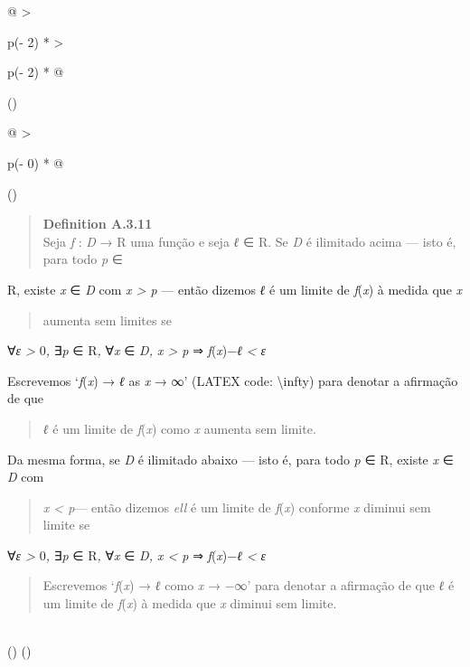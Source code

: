 \documentclass[
]{article}
\begin{document}
\begin{longtable}[]{@{}
  >{\raggedright\arraybackslash}p{(\columnwidth - 2\tabcolsep) * }
  >{\raggedright\arraybackslash}p{(\columnwidth - 2\tabcolsep) * }@{}}
\toprule()
\begin{minipage}[b]{\linewidth}\raggedright
\begin{longtable}[]{@{}
  >{\raggedright\arraybackslash}p{(\columnwidth - 0\tabcolsep) * }@{}}
\toprule()
\begin{minipage}[b]{\linewidth}\raggedright
\begin{quote}
\textbf{Definition A.3.11}\\
Seja \emph{f} : \emph{D} → R uma função e seja \emph{ℓ} ∈ R. Se \emph{D}
é ilimitado acima --- isto é, para todo \emph{p} ∈
\end{quote}

R, existe \emph{x} ∈ \emph{D} com \emph{x \textgreater{} p} --- então
dizemos \emph{ℓ} é um limite de \emph{f}(\emph{x}) à medida que \emph{x}

\begin{quote}
aumenta sem limites se
\end{quote}

∀\emph{ε \textgreater{}} 0\emph{,} ∃\emph{p} ∈ R\emph{,} ∀\emph{x} ∈
\emph{D, x \textgreater{} p} ⇒
\textbar{}\emph{f}(\emph{x})−\emph{ℓ}\textbar{} \emph{\textless{} ε}

Escrevemos `\emph{f}(\emph{x}) → \emph{ℓ} as \emph{x} → ∞' (LATEX code:
\textbackslash infty) para denotar a afirmação de que

\begin{quote}
\emph{ℓ} é um limite de \emph{f}(\emph{x}) como \emph{x} aumenta sem
limite.
\end{quote}

Da mesma forma, se \emph{D} é ilimitado abaixo --- isto é, para todo
\emph{p} ∈ R, existe \emph{x} ∈ \emph{D} com

\begin{quote}
\emph{x \textless{} p}--- então dizemos \emph{ell} é um limite de
\emph{f}(\emph{x}) conforme \emph{x} diminui sem limite se
\end{quote}

∀\emph{ε \textgreater{}} 0\emph{,} ∃\emph{p} ∈ R\emph{,} ∀\emph{x} ∈
\emph{D, x \textless{} p} ⇒
\textbar{}\emph{f}(\emph{x})−\emph{ℓ}\textbar{} \emph{\textless{} ε}

\begin{quote}
Escrevemos `\emph{f}(\emph{x}) → \emph{ℓ} como \emph{x} → −∞' para
denotar a afirmação de que \emph{ℓ} é um limite de \emph{f}(\emph{x}) à
medida que \emph{x} diminui sem limite.
\end{quote}\strut
\end{minipage} \\
\midrule()
\endhead
\bottomrule()
\end{longtable}


\end{minipage}
\end{longtable}
\end{document}
